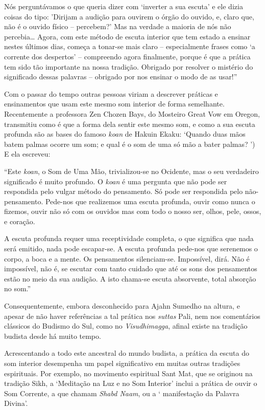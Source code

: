Nós perguntávamos o que queria dizer com `inverter a sua escuta' e ele
dizia coisas do tipo: 'Dirijam a audição para ouvirem o órgão do ouvido,
e, claro que, não é o ouvido físico -- percebem?' Mas na verdade a
maioria de nós não percebia\ldots{} Agora, com este método de escuta
interior que tem estado a ensinar nestes últimos dias, começa a tonar-se
mais claro -- especialmente frases como `a corrente dos despertos' --
compreendo agora finalmente, porque é que a prática tem sido tão
importante na nossa tradição. Obrigado por resolver o mistério do
significado dessas palavras -- obrigado por nos ensinar o modo de as
usar!''

Com o passar do tempo outras pessoas viriam a descrever práticas e
ensinamentos que usam este mesmo som interior de forma semelhante.
Recentemente a professora Zen Chozen Bays, do Mosteiro Great Vow em
Oregon, transmitiu como é que a forma dela sentir este mesmo som, e como
a sua escuta profunda são as bases do famoso \emph{koan} de Hakuin
Ekaku: `Quando duas mãos batem palmas ocorre um som; e qual é o som de
uma só mão a bater palmas? ') E ela escreveu:

``Este \emph{koan}, o Som de Uma Mão, trivializou-se no Ocidente, mas o
seu verdadeiro significado é muito profundo. O \emph{koan} é uma
pergunta que não pode ser respondida pelo vulgar método do pensamento.
Só pode ser respondida pelo não-pensamento. Pede-nos que realizemos uma
escuta profunda, ouvir como nunca o fizemos, ouvir não só com os ouvidos
mas com todo o nosso ser, olhos, pele, ossos, e coração.

A escuta profunda requer uma receptividade completa, o que significa que
nada será emitido, nada pode escapar-se. A escuta profunda pede-nos que
serenemos o corpo, a boca e a mente. Os pensamentos silenciam-se.
Impossível, dirá. Não é impossível, não é, se escutar com tanto cuidado
que até os sons dos pensamentos estão no meio da sua audição. A isto
chama-se escuta absorvente, total absorção no som.''\cite{deep}

Consequentemente, embora desconhecido para Ajahn Sumedho na altura, e
apesar de não haver referências a tal prática nos \emph{suttas} Pali,
nem nos comentários clássicos do Budismo do Sul, como no
\emph{Visudhimagga}, afinal existe na tradição budista desde há muito
tempo.

Acrescentando a todo este ancestral do mundo budista, a prática da
escuta do som interior desempenha um papel significativo em muitas
outras tradições espirituais. Por exemplo, no movimento espiritual Sant
Mat, que se originou na tradição Sikh, a `Meditação na Luz e no Som
Interior' inclui a prática de ouvir o Som Corrente, a que chamam
\emph{Shabd Naam}, ou a ` manifestação da Palavra Divina'.

